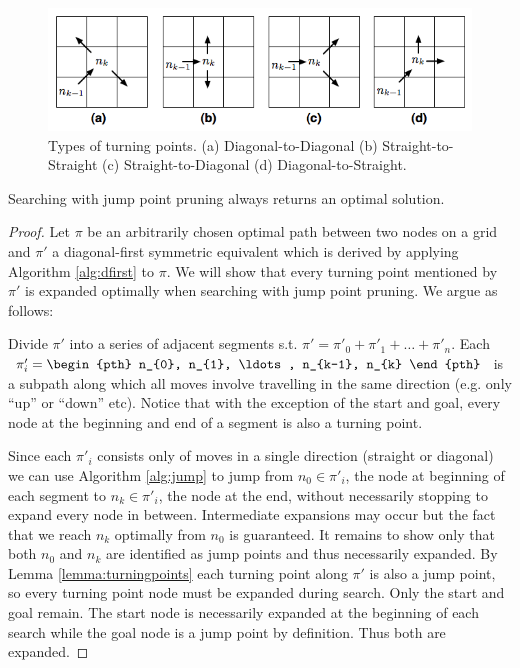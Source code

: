 \begin{figure}[tb]
       \begin{center}
		   \includegraphics[width=0.95\columnwidth, trim = 10mm 10mm 10mm 0mm]
			{diagrams/turningpoints.png}
       \end{center}
	\vspace{-3pt}
       \caption{Types of turning points. (a) Diagonal-to-Diagonal
(b) Straight-to-Straight (c) Straight-to-Diagonal (d) Diagonal-to-Straight.}
       \label{fig:turningpoints}
\end{figure}

\begin{theorem}
\label{theorem:jumping}
Searching with jump point pruning always returns an optimal solution. 
\end{theorem}
\begin{proof}
Let $\pi$ be an arbitrarily chosen optimal path between two nodes
on a grid and $\pi'$ a diagonal-first symmetric equivalent which is derived
by applying Algorithm \ref{alg:dfirst} to $\pi$.
We will show that every turning point mentioned by $\pi'$ is expanded optimally 
when searching with jump point pruning. We argue as follows:
\par
Divide $\pi'$ into a series of adjacent segments s.t. 
$\pi' = \pi'_{0} + \pi'_{1} + \ldots + \pi'_{n} $. Each $\pi'_{i} = \begin{pth} n_{0}, n_{1},
\ldots, n_{k-1}, n_{k} \end{pth}$ is a subpath along which all moves involve
travelling in the same direction (e.g.  only ``up'' or ``down'' etc).  Notice
that with the exception of the start and goal, every node at the beginning and
end of a segment is also a turning point.
\par
Since each $\pi'_{i}$ consists only of moves in a single direction
(straight or diagonal) we can use Algorithm \ref{alg:jump} to jump from $n_{0}
\in \pi'_{i}$, the node at beginning of each segment to $n_{k} \in \pi'_{i}$, the
node at the end, without necessarily stopping to expand every node in between.
Intermediate expansions may occur but the fact that we reach $n_{k}$
optimally from $n_{0}$ is guaranteed.
It remains to show only that both $n_{0}$ and $n_{k}$ are identified as
jump points and thus necessarily expanded. 
By Lemma \ref{lemma:turningpoints} each turning point along $\pi'$ is 
also a jump point, so every turning point node must be expanded during search.
Only the start and goal remain. The start node is necessarily expanded at the
beginning of each search while the goal node is a jump point by definition.
Thus both are expanded.
\end{proof}
